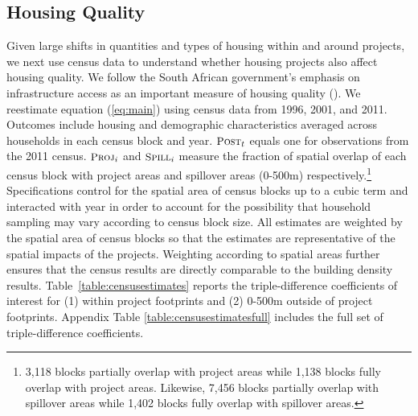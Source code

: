 \documentclass[12pt]{article}
\begin{document}
\subsection{Housing Quality}\label{section:resultscensus}

Given large shifts in quantities and types of housing within and around projects, we next use census data to understand whether housing projects also affect housing quality.  We follow the South African government's emphasis on infrastructure access as an important measure of housing quality (\citep{housingact}).  We reestimate equation (\ref{eq:main}) using census data from 1996, 2001, and 2011.  Outcomes include housing and demographic characteristics averaged across households in each census block and year.  $\textsc{\small Post}_{t}$ equals one for observations from the 2011 census.  $\textsc{\small Proj}_{i}$ and $\textsc{\small Spill}_{i}$ measure the fraction of spatial overlap of each census block with project areas and spillover areas (0-500m) respectively.\footnote{3,118 blocks partially overlap with project areas while 1,138 blocks fully overlap with project areas.  Likewise, 7,456 blocks partially overlap with spillover areas while 1,402 blocks fully overlap with spillover areas.}  Specifications control for the spatial area of census blocks up to a cubic term and interacted with year in order to account for the possibility that household sampling may vary according to census block size.  All estimates are weighted by the spatial area of census blocks so that the estimates are representative of the spatial impacts of the projects.  Weighting according to spatial areas further ensures that the census results are directly comparable to the building density results.  Table~\ref{table:censusestimates} reports the triple-difference coefficients of interest for (1) within project footprints and (2) 0-500m outside of project footprints.  Appendix Table \ref{table:censusestimatesfull} includes the full set of triple-difference coefficients.
\end{document}

